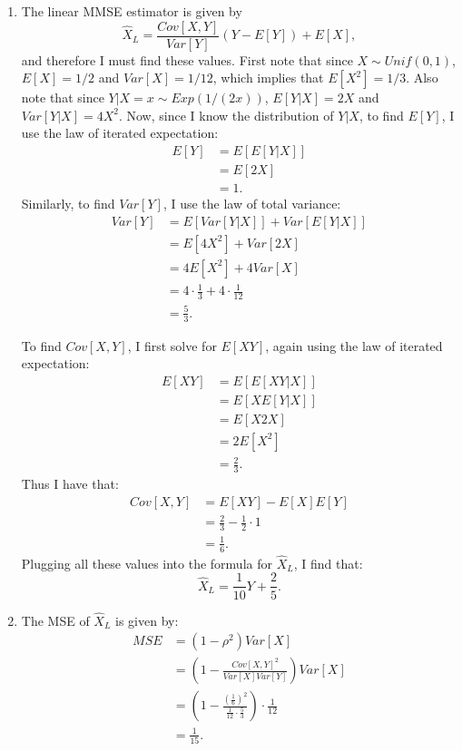 \begin{problem}{6} $ $

\begin{enumerate}

\item The linear MMSE estimator is given by
\begin{equation*}
\hat X_L = \frac{Cov[X, Y]}{Var[Y]}(Y-E[Y])+E[X],
\end{equation*}
and therefore I must find these values.  First note that since $X\sim Unif(0, 1)$, $E[X]=1/2$ and $Var[X] = 1/12$, which implies that $E[X^2] = 1/3$.  Also note that since $Y|X=x\sim Exp(1/(2x))$, $E[Y|X] = 2X$ and $Var[Y|X] = 4X^2$.  Now, since I know the distribution of $Y|X$, to find $E[Y]$, I use the law of iterated expectation:
\begin{align*}
E[Y] &= E[E[Y|X]] \\
& = E[2X]\\
& = 1.
\end{align*}
Similarly, to find $Var[Y]$, I use the law of total variance:
\begin{align*}
Var[Y] &= E[Var[Y|X]]+Var[E[Y|X]] \\
& = E[4X^2]+Var[2X]\\
& = 4E[X^2]+4Var[X]\\
& = 4\cdot \frac{1}{3}+4\cdot \frac{1}{12}\\
& = \frac{5}{3}.
\end{align*}

To find $Cov[X, Y]$, I first solve for $E[XY]$, again using the law of iterated expectation:
\begin{align*}
E[XY] &= E[E[XY|X]] \\
&= E[XE[Y|X]] \\
&= E[X2X] \\
&= 2E[X^2] \\
&= \frac{2}{3}.
\end{align*}
Thus I have that:
\begin{align*}
Cov[X,Y] &= E[XY] -E[X]E[Y] \\
&= \frac{2}{3} -\frac{1}{2}\cdot 1  \\
&=\frac{1}{6}.
\end{align*}
Plugging all these values into the formula for $\hat X_L $, I find that:
\begin{equation*}
\hat X_L = \frac{1}{10}Y+\frac{2}{5}.
\end{equation*}

\item The MSE of $\hat X_L$ is given by:
\begin{align*}
MSE &= (1-\rho^2)Var[X] \\
& = \left (1-\frac{Cov[X, Y]^2}{Var[X] Var[Y]} \right)Var[X] \\
& = \left (1-\frac{\left (\frac{1}{6} \right)^2}{\frac{1}{12}\cdot \frac{5}{3}} \right)\cdot \frac{1}{12} \\
& = \frac{1}{15}.
\end{align*}


\end{enumerate}
\end{problem}
